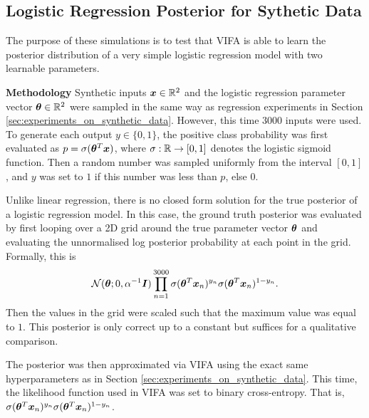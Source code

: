 \documentclass[10pt]{article} %
\begin{document}
\subsection{Logistic Regression Posterior for Sythetic Data}
\label{app:results_of_logistic_regression_posterior_for_sythetic_data}
The purpose of these simulations is to test that VIFA is able to learn the posterior distribution of a very simple logistic regression model with two learnable parameters.

\textbf{Methodology} Synthetic inputs ${\bm{x}} \in \mathbb{R}^2$ and the logistic regression parameter vector ${\bm{\theta}} \in \mathbb{R}^2$ were sampled in the same way as regression experiments in Section \ref{sec:experiments_on_synthetic_data}. However, this time $3000$ inputs were used. To generate each output $y \in \{0, 1\}$, the positive class probability was first evaluated as $p = \sigma({\bm{\theta}}^T {\bm{x}})$, where $\sigma: \mathbb{R} \rightarrow [0,1]$ denotes the logistic sigmoid function. Then a random number was sampled uniformly from the interval $[0, 1]$, and $y$ was set to $1$ if this number was less than $p$, else $0$.

Unlike linear regression, there is no closed form solution for the true posterior of a logistic regression model. In this case, the ground truth posterior was evaluated by first looping over a 2D grid around the true parameter vector ${\bm{\theta}}$ and evaluating the unnormalised log posterior probability at each point in the grid. Formally, this is
\begin{equation}
	\mathcal{N} ( {\bm{\theta}} ; 0, \alpha^{-1} {\bm{I}}) \prod_{n=1}^{3000} \sigma({\bm{\theta}}^T {\bm{x}}_n)^{y_n} \sigma({\bm{\theta}}^T {\bm{x}}_n)^{1 - y_n}.
\end{equation}
Then the values in the grid were scaled such that the maximum value was equal to $1$. This posterior is only correct up to a constant but suffices for a qualitative comparison.

The posterior was then approximated via VIFA using the exact same hyperparameters as in Section \ref{sec:experiments_on_synthetic_data}. This time, the likelihood function used in VIFA was set to binary cross-entropy. That is, $\sigma({\bm{\theta}}^T {\bm{x}}_n)^{y_n} \sigma({\bm{\theta}}^T {\bm{x}}_n)^{1 - y_n}$.
\end{document}
